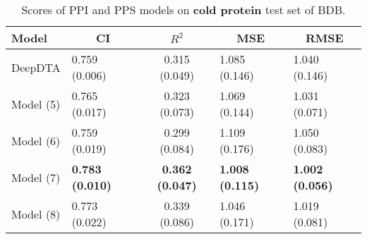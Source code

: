 \begin{table}[H]
\centering
\caption{Scores of PPI and PPS models on \textbf{cold protein} test set of BDB.}
\label{tab:ddi_ci_r2}
\begin{tabular}{|l|l|c|l|l|} 
\hline
Model & \multicolumn{1}{c|}{CI} & $R^2$ & \multicolumn{1}{c|}{MSE} & \multicolumn{1}{c|}{RMSE} \\ 
\hline
DeepDTA & 0.759 (0.006) & 0.315 (0.049) & 1.085 (0.146) & 1.040 (0.146) \\ 
\hline
Model (5) & 0.765 (0.017) & 0.323 (0.073) & 1.069 (0.144) & 1.031 (0.071) \\ 
\hline
Model (6) & 0.759 (0.019) & 0.299 (0.084) & 1.109 (0.176) & 1.050 (0.083) \\ 
\hline
Model (7) & \textbf{0.783 (0.010)} & \textbf{0.362 (0.047)} & \textbf{1.008 (0.115)} & \textbf{1.002 (0.056)} \\ 
\hline
Model (8) & 0.773 (0.022) & 0.339 (0.086) & 1.046 (0.171) & 1.019 (0.081) \\
\hline
\end{tabular}
\label{tab:ppi_vs_pps_cold_protein}
\end{table}